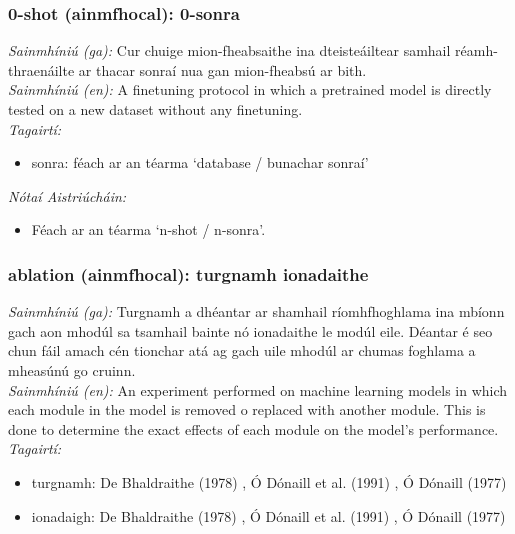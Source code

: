 \subsubsection*{0-shot (ainmfhocal): 0-sonra}
 \noindent \textit{Sainmhíniú (ga):} Cur chuige mion-fheabsaithe ina dteisteáiltear samhail réamh-thraenáilte ar thacar sonraí nua gan mion-fheabsú ar bith.
\\
 \noindent \textit{Sainmhíniú (en):} A finetuning protocol in which a pretrained model is directly tested on a new dataset without any finetuning.
\\
 \noindent \textit{Tagairtí:}
\begin{itemize}
	\item sonra: féach ar an téarma `database / bunachar sonraí'
\end{itemize}

 \noindent \textit{Nótaí Aistriúcháin:}
\begin{itemize}
	\item Féach ar an téarma `n-shot / n-sonra'.
\end{itemize}


\subsubsection*{ablation (ainmfhocal): turgnamh ionadaithe}
 \noindent \textit{Sainmhíniú (ga):} Turgnamh a dhéantar ar shamhail ríomhfhoghlama ina mbíonn gach aon mhodúl sa tsamhail bainte nó ionadaithe le modúl eile. Déantar é seo chun fáil amach cén tionchar atá ag gach uile mhodúl ar chumas foghlama a mheasúnú go cruinn.
\\
 \noindent \textit{Sainmhíniú (en):} An experiment performed on machine learning models in which each module in the model is removed o replaced with another module. This is done to determine the exact effects of each module on the model's performance.
\\
 \noindent \textit{Tagairtí:}
\begin{itemize}
	\item turgnamh: De Bhaldraithe (1978) \cite{de-bhaldraithe}, Ó Dónaill et al. (1991) \cite{focloir-beag}, Ó Dónaill (1977) \cite{odonaill}
	\item ionadaigh: De Bhaldraithe (1978) \cite{de-bhaldraithe}, Ó Dónaill et al. (1991) \cite{focloir-beag}, Ó Dónaill (1977) \cite{odonaill}
\end{itemize}

